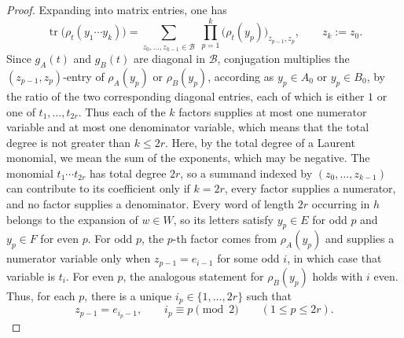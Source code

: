 \begin{proof}
    Expanding into matrix entries, one has
    \begin{equation}
        \operatorname{tr}\bigl(\rho_t(y_1\cdots y_k)\bigr)
        =\sum_{z_0,\ldots,z_{k-1}\in\mathcal{B}}\;\prod_{p=1}^{k}\bigl(\rho_t(y_p)\bigr)_{z_{p-1},z_p},
        \qquad z_k:=z_0.
    \end{equation}
    Since \(g_A(t)\) and \(g_B(t)\) are diagonal in \(\mathcal{B}\), conjugation multiplies the \((z_{p-1},z_p)\)-entry of \(\rho_A(y_p)\) or \(\rho_B(y_p)\), according as \(y_p\in A_0\) or \(y_p\in B_0\), by the ratio of the two corresponding diagonal entries, each of which is either \(1\) or one of \(t_1,\ldots,t_{2r}\). Thus each of the \(k\) factors supplies at most one numerator variable and at most one denominator variable, which means that the total degree is not greater than \(k\leq 2r\). Here, by the total degree of a Laurent monomial, we mean the sum of the exponents, which may be negative.
    The monomial \(t_1\cdots t_{2r}\) has total degree \(2r\), so a summand indexed by \((z_0,\ldots,z_{k-1})\) can contribute to its coefficient only if \(k=2r\), every factor supplies a numerator, and no factor supplies a denominator.
    Every word of length \(2r\) occurring in \(h\) belongs to the expansion of \(w\in W\), so its letters satisfy \(y_p\in E\) for odd \(p\) and \(y_p\in F\) for even \(p\).
    For odd \(p\), the \(p\)-th factor comes from \(\rho_A(y_p)\) and supplies a numerator variable only when \(z_{p-1}=e_{i-1}\) for some odd \(i\), in which case that variable is \(t_i\). For even \(p\), the analogous statement for \(\rho_B(y_p)\) holds with \(i\) even. Thus, for each \(p\), there is a unique \(i_p\in\{1,\ldots,2r\}\) such that
    \[
        z_{p-1}=e_{i_p-1},\qquad i_p\equiv p\pmod2\qquad(1\leq p\leq 2r).
    \]


\end{proof}

